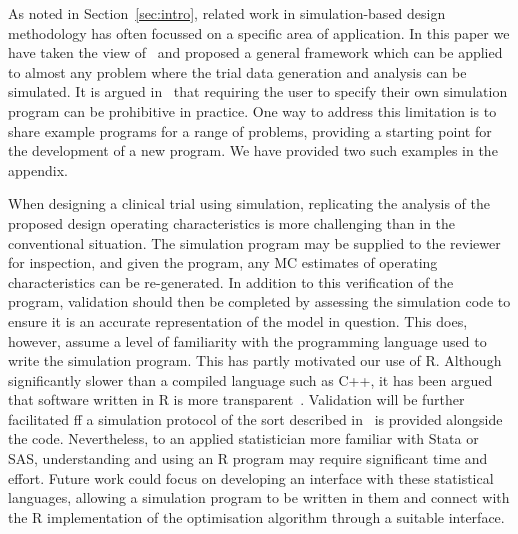 \documentclass{article} %
\begin{document}


As noted in Section~\ref{sec:intro}, related work in simulation-based design methodology has often focussed on a specific area of application. In this paper we have taken the view of~\cite{Hooper2013} and proposed a general framework which can be applied to almost any problem where the trial data generation and analysis can be simulated. It is argued in~\cite{Kontopantelis2016} that requiring the user to specify their own simulation program can be prohibitive in practice. One way to address this limitation is to share example programs for a range of problems, providing a starting point for the development of a new program. We have provided two such examples in the appendix.

When designing a clinical trial using simulation, replicating the analysis of the proposed design operating characteristics is more challenging than in the conventional situation. The simulation program may be supplied to the reviewer for inspection, and given the program, any MC estimates of operating characteristics can be re-generated. In addition to this verification of the program, validation should then be completed by assessing the simulation code to ensure it is an accurate representation of the model in question. This does, however, assume a level of familiarity with the programming language used to write the simulation program. This has partly motivated our use of R. Although significantly slower than a compiled language such as C++, it has been argued that software written in R is more transparent~\cite{Smith2010}. Validation will be further facilitated ff a simulation protocol of the sort described in~\cite{Smith2010} is provided alongside the code. Nevertheless, to an applied statistician more familiar with Stata or SAS, understanding and using an R program may require significant time and effort. Future work could focus on developing an interface with these statistical languages, allowing a simulation program to be written in them and connect with the R implementation of the optimisation algorithm through a suitable interface.
\end{document}
